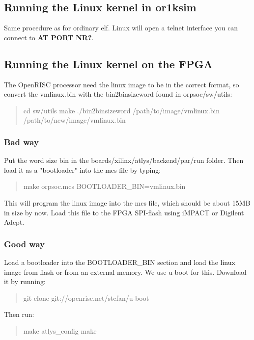 \documentclass[10pt,a4paper]{article}
\begin{document}
\subsection{Running the Linux kernel in or1ksim}
Same procedure as for ordinary elf. Linux will open a telnet interface you can connect to \textbf{AT PORT NR?}.

\subsection{Running the Linux kernel on the FPGA}
The OpenRISC processor need the linux image to be in the correct format, so convert the vmlinux.bin with the bin2binsizeword found in orpsoc/sw/utils:

\begin{quote}
cd sw/utils \newline
make \newline
./bin2binsizeword /path/to/image/vmlinux.bin /path/to/new/image/vmlinux.bin
\end{quote}

\subsubsection{Bad way}
Put the word size bin in the boards/xilinx/atlys/backend/par/run folder. Then load it as a "bootloader" into the mcs file by typing:

\begin{quote}
make orpsoc.mcs BOOTLOADER\_BIN=vmlinux.bin
\end{quote}

This will program the linux image into the mcs file, which should be about 15MB in size by now. Load this file to the FPGA SPI-flash using iMPACT or Digilent Adept.

\subsubsection{Good way}
Load a bootloader into the BOOTLOADER\_BIN section and load the linux image from flash or from an external memory. We use u-boot for this. Download it by running:

\begin{quote}
git clone git://openrisc.net/stefan/u-boot
\end{quote}

Then run:

\begin{quote}
make atlys\_config \newline
make
\end{quote}
\end{document}
